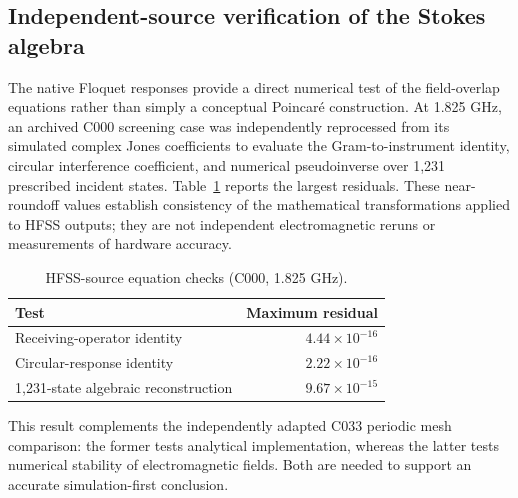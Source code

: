 \documentclass{ieeeaccess}
\begin{document}
\subsection{Independent-source verification of the Stokes algebra}
The native Floquet responses provide a direct numerical test of the field-overlap equations rather than simply a conceptual Poincar\'e construction. At 1.825 GHz, an archived C000 screening case was independently reprocessed from its simulated complex Jones coefficients to evaluate the Gram-to-instrument identity, circular interference coefficient, and numerical pseudoinverse over 1,231 prescribed incident states. Table~\ref{tab:equation-validation} reports the largest residuals. These near-roundoff values establish consistency of the mathematical transformations applied to HFSS outputs; they are not independent electromagnetic reruns or measurements of hardware accuracy.
\begin{table}[tb]
\caption{HFSS-source equation checks (C000, 1.825 GHz).}
\label{tab:equation-validation}
\centering\small
\begin{tabular}{@{}lr@{}}
\toprule
Test & Maximum residual\\
\midrule
Receiving-operator identity & $4.44\times10^{-16}$\\
Circular-response identity & $2.22\times10^{-16}$\\
1,231-state algebraic reconstruction & $9.67\times10^{-15}$\\
\bottomrule
\end{tabular}
\end{table}
This result complements the independently adapted C033 periodic mesh comparison: the former tests analytical implementation, whereas the latter tests numerical stability of electromagnetic fields. Both are needed to support an accurate simulation-first conclusion.
\end{document}
